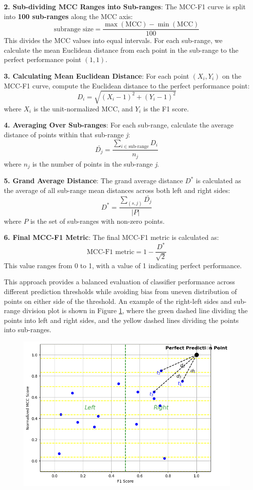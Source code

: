 \documentclass[12pt, oneside]{amsart}
\theoremstyle{definition}
\theoremstyle{remark}
\numberwithin{equation}{section}
\begin{document}
\textbf{2. Sub-dividing MCC Ranges into Sub-ranges}:
   The MCC-F1 curve is split into \textbf{100 sub-ranges} along the MCC axis:
   \[
   \text{subrange size} = \frac{\max(\text{MCC}) - \min(\text{MCC})}{100}
   \]
   This divides the MCC values into equal intervals. For each sub-range, we calculate the mean Euclidean distance from each point in the sub-range to the perfect performance point \((1, 1)\).

\textbf{3. Calculating Mean Euclidean Distance}:
   For each point \((X_i, Y_i)\) on the MCC-F1 curve, compute the Euclidean distance to the perfect performance point:
   \[
   D_i = \sqrt{(X_i - 1)^2 + (Y_i - 1)^2}
   \]
   where \( X_i \) is the unit-normalized MCC, and \( Y_i \) is the F1 score.

\textbf{4. Averaging Over Sub-ranges}:
   For each sub-range, calculate the average distance of points within that sub-range \textit{j}:
   \[
   \bar{D_j} = \frac{\sum_{i \in \text{sub-range}} D_i}{n_j}
   \]
   where \( n_j \) is the number of points in the sub-range \textit{j}.

\textbf{5. Grand Average Distance}:
   The grand average distance \( D^* \) is calculated as the average of all sub-range mean distances across both left and right sides:
   \[
   D^* = \frac{\sum_{(s, j)} \bar{D_j}}{|P|}
   \]
   where \( P \) is the set of sub-ranges with non-zero points.

\textbf{6. Final MCC-F1 Metric}:
   The final MCC-F1 metric is calculated as:
   \[
   \text{MCC-F1 metric} = 1 - \frac{D^*}{\sqrt{2}}
   \]
   This value ranges from 0 to 1, with a value of 1 indicating perfect performance.

This approach provides a balanced evaluation of classifier performance across different prediction thresholds while avoiding bias from uneven distribution of points on either side of the threshold. An example of the right-left sides and sub-range division plot is shown in Figure \ref{figure2}, where the green dashed line dividing the points into left and right sides, and the yellow dashed lines dividing the points into sub-ranges. 
\begin{figure}[hbt!]
    \caption{}
    \centering
    \includegraphics[scale=0.3]{Report/Figure/figure2.jpg}
    \label{figure2}
\end{figure}
\FloatBarrier
\end{document}
